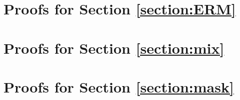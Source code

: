\documentclass{article}
\theoremstyle{plain}
\theoremstyle{definition}
\theoremstyle{remark}
\begin{document}
\appendix

\section{Proofs for Section \ref{section:ERM}}




\section{Proofs for Section \ref{section:mix}}




\section{Proofs for Section \ref{section:mask}}





\end{document}
